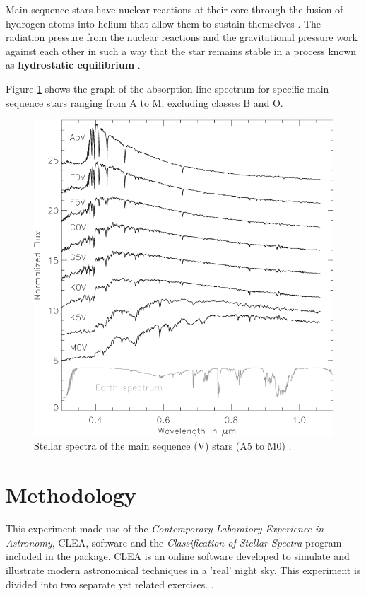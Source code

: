 \documentclass[12pt]{article}
\begin{document}
Main sequence stars have nuclear reactions at their core through the fusion of hydrogen atoms into helium that allow them to sustain themselves
\cite{schoolmsstar,studymsstar,nasamsstar}.
The radiation pressure from the nuclear reactions and the gravitational pressure work against each other in such a way that the star
remains stable \cite{studymsstar} in a process known as \textbf{hydrostatic equilibrium} \cite{schoolmsstar}.

Figure \ref{fig:msgraphspec} shows the graph of the absorption line spectrum for specific main sequence stars ranging from A to M, excluding classes B and O.

\begin{figure}[H]
    \centering
    \includegraphics[width=12.5cm]{msspectra.png}
    \caption{\centering Stellar spectra of the main sequence (V) stars (A5 to M0) \protect\cite{msspectrarticle}.}
    \label{fig:msgraphspec}
\end{figure}

\section{Methodology} \label{sec:2}

This experiment made use of the \textit{Contemporary Laboratory Experience in Astronomy}, CLEA, software and the \textit{Classification of Stellar Spectra} program included in the package.
CLEA is an online software developed to simulate and illustrate modern astronomical techniques in a 'real' night sky. This experiment is divided into two separate yet related exercises.
\cite{cleaspectra}.
\end{document}
